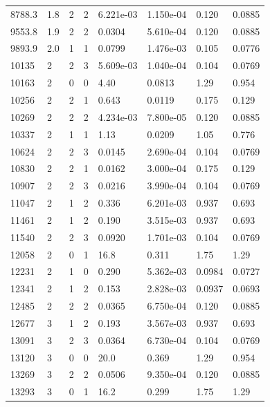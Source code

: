 \documentclass[preview]{standalone}
\begin{document}
{{{\begin{tabular}{L{1.2cm}C{1.2cm} C{0.3cm}C{0.5cm} C{1.4cm}C{1.4cm} C{1.4cm}C{1.4cm}}
  8788.3  &   1.8  & 2     &  2 &  6.221e-03  & 1.150e-04  & 0.120 &  0.0885   \\ 
  9553.8  &   1.9  & 2     &  2 &  0.0304  & 5.610e-04  & 0.120 &  0.0885   \\ 
  9893.9  &   2.0  & 1     &  1 &  0.0799  & 1.476e-03  & 0.105 &  0.0776   \\ 
  10135  &     2  & 2     &  3 &  5.609e-03  & 1.040e-04  & 0.104 &  0.0769   \\ 
  10163  &     2  & 0     &  0 &  4.40  & 0.0813  & 1.29 &  0.954   \\ 
  10256  &     2  & 2     &  1 &  0.643  & 0.0119  & 0.175 &  0.129   \\ 
  10269  &     2  & 2     &  2 &  4.234e-03  & 7.800e-05  & 0.120 &  0.0885   \\ 
  10337  &     2  & 1     &  1 &  1.13  & 0.0209  & 1.05 &  0.776   \\ 
  10624  &     2  & 2     &  3 &  0.0145  & 2.690e-04  & 0.104 &  0.0769   \\ 
  10830  &     2  & 2     &  1 &  0.0162  & 3.000e-04  & 0.175 &  0.129   \\ 
  10907  &     2  & 2     &  3 &  0.0216  & 3.990e-04  & 0.104 &  0.0769   \\ 
  11047  &     2  & 1     &  2 &  0.336  & 6.201e-03  & 0.937 &  0.693   \\ 
  11461  &     2  & 1     &  2 &  0.190  & 3.515e-03  & 0.937 &  0.693   \\ 
  11540  &     2  & 2     &  3 &  0.0920  & 1.701e-03  & 0.104 &  0.0769   \\ 
  12058  &     2  & 0     &  1 &  16.8  & 0.311  & 1.75 &  1.29   \\ 
  12231  &     2  & 1     &  0 &  0.290  & 5.362e-03  & 0.0984 &  0.0727   \\ 
  12341  &     2  & 1     &  2 &  0.153  & 2.828e-03  & 0.0937 &  0.0693   \\ 
  12485  &     2  & 2     &  2 &  0.0365  & 6.750e-04  & 0.120 &  0.0885   \\ 
  12677  &     3  & 1     &  2 &  0.193  & 3.567e-03  & 0.937 &  0.693   \\ 
  13091  &     3  & 2     &  3 &  0.0364  & 6.730e-04  & 0.104 &  0.0769   \\ 
  13120  &     3  & 0     &  0 &  20.0  & 0.369  & 1.29 &  0.954   \\ 
  13269  &     3  & 2     &  2 &  0.0506  & 9.350e-04  & 0.120 &  0.0885   \\ 
  13293  &     3  & 0     &  1 &  16.2  & 0.299  & 1.75 &  1.29   \\ 

\end{tabular}}}}
\end{document}
